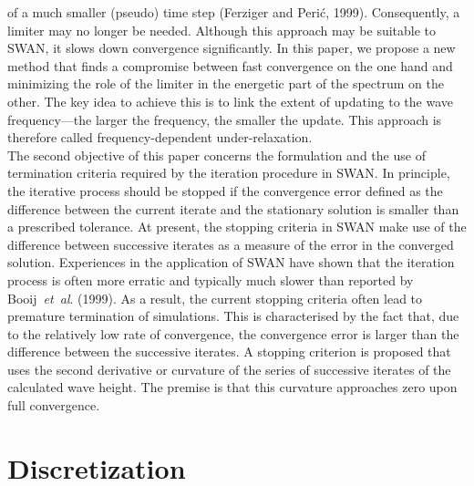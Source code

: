 \documentclass[12pt]{book}
\begin{document}
of a much smaller (pseudo) time step (Ferziger and Peri\'{c}, 1999).
Consequently, a limiter may no longer be needed. Although this
approach may be suitable to SWAN, it slows down convergence significantly.
In this paper, we propose a new method that finds a
compromise between fast convergence on the one hand and minimizing the role of the limiter in the
energetic part of the
spectrum on the other. The key idea to achieve this is to link the extent of updating to the wave
frequency---the
larger the frequency, the smaller the update. This approach is therefore called frequency-dependent
under-relaxation.
\nocite{Fer99P}
\\[2ex]
\noindent
The second objective of this paper concerns the formulation and the use of termination criteria required by
the iteration procedure in SWAN.
In principle, the iterative process should be stopped if the convergence error defined as the
difference between the current iterate and the stationary solution is smaller
than a prescribed tolerance. At present, the stopping criteria in SWAN make
use of the difference between successive iterates as a measure of the error
in the converged solution.
Experiences in the application of SWAN have shown that the iteration process is often
more erratic and typically much slower than reported by Booij~{\it et~al}. (1999).
As a result, the current stopping criteria
often lead to premature termination of simulations. This is characterised by the fact that,
due to the relatively low rate of convergence,
the convergence error is larger than the difference between the successive iterates.
A stopping criterion is proposed that uses the second derivative
or curvature of the series of successive iterates of the calculated wave height. The premise is that
this curvature approaches zero upon full convergence.
\nocite{Boo99RH}

\section{Discretization} \label{sec:dsc}
\end{document}

